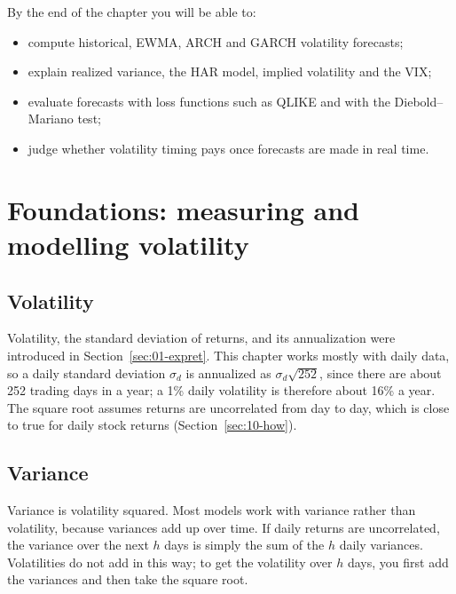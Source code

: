 By the end of the chapter you will be able to:

\begin{itemize}[nosep]
  \item compute historical, EWMA, ARCH and GARCH volatility forecasts;
  \item explain realized variance, the HAR model, implied volatility and the VIX;
  \item evaluate forecasts with loss functions such as QLIKE and with the Diebold--Mariano test;
  \item judge whether volatility timing pays once forecasts are made in real time.
\end{itemize}


\section{Foundations: measuring and modelling volatility}
\label{sec:10-foundations}

\subsection{Volatility}

Volatility, the standard deviation of returns, and its annualization were introduced in Section~\ref{sec:01-expret}. This chapter works mostly with daily data, so a daily standard deviation $\sigma_d$ is annualized as $\sigma_d\sqrt{252}$, since there are about 252 trading days in a year; a 1\% daily volatility is therefore about 16\% a year. 
The square root assumes returns are uncorrelated from day to day, which is close to true for daily stock returns (Section~\ref{sec:10-how}). 

\subsection{Variance}

Variance is volatility squared. 
Most models work with variance rather than volatility, because variances add up over time. If daily returns are uncorrelated, the variance over the next $h$ days is simply the sum of the $h$ daily variances. Volatilities do not add in this way; to get the volatility over $h$ days, you first add the variances and then take the square root.


